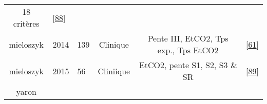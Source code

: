 \documentclass[12pt,]{article}
\begin{document}
\begin{landscape}
\begin{longtable}[]{@{}cllccl@{}}
\begin{minipage}[t]{0.40\columnwidth}
18 critères\strut
\end{minipage} & \begin{minipage}[t]{0.08\columnwidth}\raggedright
{[}\protect\hyperlink{ref-lukic2006novel}{88}{]}\strut
\end{minipage}\tabularnewline
\begin{minipage}[t]{0.09\columnwidth}\centering
mieloszyk\strut
\end{minipage} & \begin{minipage}[t]{0.05\columnwidth}\raggedright
2014\strut
\end{minipage} & \begin{minipage}[t]{0.08\columnwidth}\raggedright
139\strut
\end{minipage} & \begin{minipage}[t]{0.14\columnwidth}\centering
Clinique\strut
\end{minipage} & \begin{minipage}[t]{0.40\columnwidth}\centering
Pente III, EtCO2, Tps exp., Tps EtCO2\strut
\end{minipage} & \begin{minipage}[t]{0.08\columnwidth}\raggedright
{[}\protect\hyperlink{ref-mieloszyk2014automated}{61}{]}\strut
\end{minipage}\tabularnewline
\begin{minipage}[t]{0.09\columnwidth}\centering
mieloszyk\strut
\end{minipage} & \begin{minipage}[t]{0.05\columnwidth}\raggedright
2015\strut
\end{minipage} & \begin{minipage}[t]{0.08\columnwidth}\raggedright
56\strut
\end{minipage} & \begin{minipage}[t]{0.14\columnwidth}\centering
Cliniique\strut
\end{minipage} & \begin{minipage}[t]{0.40\columnwidth}\centering
EtCO2, pente S1, S2, S3 \& SR\strut
\end{minipage} & \begin{minipage}[t]{0.08\columnwidth}\raggedright
{[}\protect\hyperlink{ref-mieloszyk2015clustering}{89}{]}\strut
\end{minipage}\tabularnewline
\begin{minipage}[t]{0.09\columnwidth}\centering
yaron\strut
\end{minipage} & \begin{minipage}[t]{0.05\columnwidth}\raggedright

\end{minipage}
\end{longtable}
\end{landscape}
\end{document}

